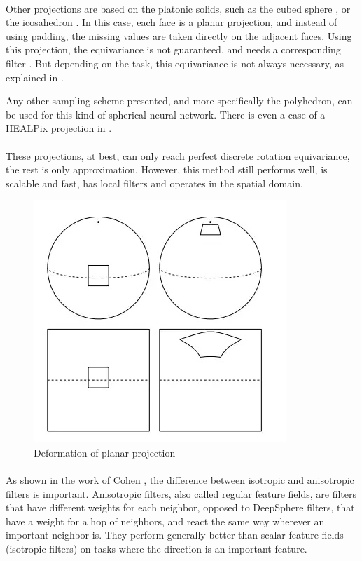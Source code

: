 \documentclass[11pt]{report}
\begin{document}
\paragraph*{}
Other projections are based on the platonic solids, such as the cubed sphere \cite{boomsma_spherical_2017}, or the icosahedron \cite{lee_spherephd:_2018}. In this case, each face is a planar projection, and instead of using padding, the missing values are taken directly on the adjacent faces.
Using this projection, the equivariance is not guaranteed, and needs a corresponding filter \cite{cohen_gauge_2019}. But depending on the task, this equivariance is not always necessary, as explained in \cite{jiang_spherical_2019}.

Any other sampling scheme presented, and more specifically the polyhedron, can be used for this kind of spherical neural network. There is even a case of a HEALPix projection in \cite{krachmalnicoff_convolutional_2019}.
    
\paragraph*{}
These projections, at best, can only reach perfect discrete rotation equivariance, the rest is only approximation. However, this method still performs well, is scalable and fast, has local filters and operates in the spatial domain.  

    \begin{figure}[h!t]
        \centering
        \includegraphics[width=0.5\linewidth]{v2-9d6a9d92bb02bc9e198c4c16397ce2fd_b.jpg}
        \caption{Deformation of planar projection \cite{cohen_spherical_2018}}
        \label{fig:planar_projection}
    \end{figure}

\paragraph*{}
As shown in the work of Cohen \cite{cohen_group_2016, cohen_gauge_2019, cohen_intertwiners_2018}, the difference between isotropic and anisotropic filters is important. Anisotropic filters, also called regular feature fields, are filters that have different weights for each neighbor, opposed to DeepSphere filters, that have a weight for a hop of neighbors, and react the same way wherever an important neighbor is.
They perform generally better than scalar feature fields (isotropic filters) on tasks where the direction is an important feature.
\end{document}
